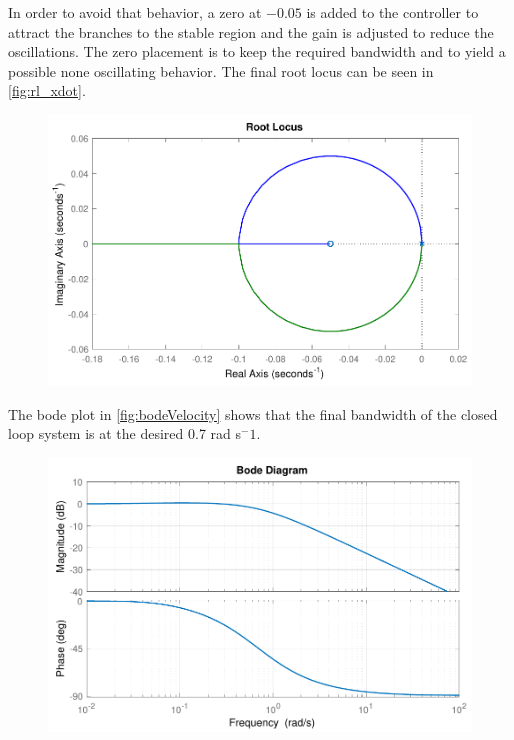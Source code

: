 In order to avoid that behavior, a zero at $-0.05$ is added to the controller to attract the branches to the stable region and the gain is adjusted to reduce the oscillations. The zero placement is to keep the required bandwidth and to yield a possible none oscillating behavior. The final root locus can be seen in \autoref{fig:rl_xdot}.
%
\begin{figure}[H]
	\includegraphics[scale=.7]{figures/rl_xdot}
	\centering			
	\label{fig:rl_xdot}
\end{figure}
%
The bode plot in \autoref{fig:bodeVelocity} shows that the final bandwidth of the closed loop system is at the desired 0.7 rad s$^-1$.
%
\begin{figure}[H]
	\includegraphics[scale=.8]{figures/bodeVelocity}
	\centering			
	\label{fig:bodeVelocity}
\end{figure}

